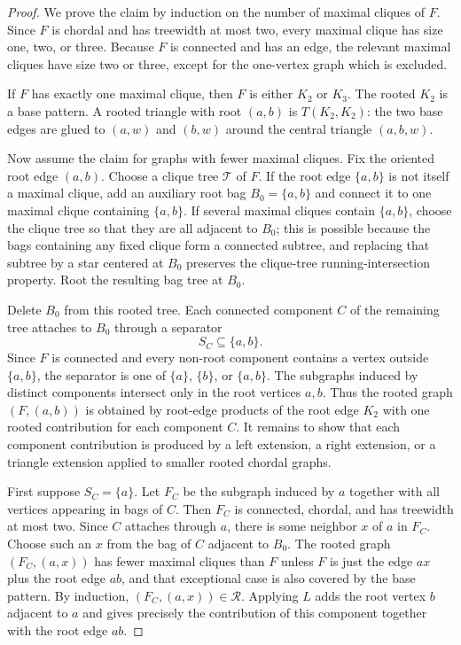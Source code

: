 \documentclass[11pt]{article}
\newcommand{\cR}{\mathcal{R}}
\begin{document}
\begin{proof}
We prove the claim by induction on the number of maximal cliques of $F$.  Since $F$ is chordal and has treewidth at most two, every maximal clique has size one, two, or three.  Because $F$ is connected and has an edge, the relevant maximal cliques have size two or three, except for the one-vertex graph which is excluded.

If $F$ has exactly one maximal clique, then $F$ is either $K_2$ or $K_3$.  The rooted $K_2$ is a base pattern.  A rooted triangle with root $(a,b)$ is $T(K_2,K_2)$: the two base edges are glued to $(a,w)$ and $(b,w)$ around the central triangle $(a,b,w)$.

Now assume the claim for graphs with fewer maximal cliques.  Fix the oriented root edge $(a,b)$.  Choose a clique tree $\mathcal{T}$ of $F$.  If the root edge $\{a,b\}$ is not itself a maximal clique, add an auxiliary root bag $B_0=\{a,b\}$ and connect it to one maximal clique containing $\{a,b\}$.  If several maximal cliques contain $\{a,b\}$, choose the clique tree so that they are all adjacent to $B_0$; this is possible because the bags containing any fixed clique form a connected subtree, and replacing that subtree by a star centered at $B_0$ preserves the clique-tree running-intersection property.  Root the resulting bag tree at $B_0$.

Delete $B_0$ from this rooted tree.  Each connected component $C$ of the remaining tree attaches to $B_0$ through a separator
\[
S_C\subseteq \{a,b\}.
\]
Since $F$ is connected and every non-root component contains a vertex outside $\{a,b\}$, the separator is one of $\{a\}$, $\{b\}$, or $\{a,b\}$.  The subgraphs induced by distinct components intersect only in the root vertices $a,b$.  Thus the rooted graph $(F,(a,b))$ is obtained by root-edge products of the root edge $K_2$ with one rooted contribution for each component $C$.  It remains to show that each component contribution is produced by a left extension, a right extension, or a triangle extension applied to smaller rooted chordal graphs.

First suppose $S_C=\{a\}$.  Let $F_C$ be the subgraph induced by $a$ together with all vertices appearing in bags of $C$.  Then $F_C$ is connected, chordal, and has treewidth at most two.  Since $C$ attaches through $a$, there is some neighbor $x$ of $a$ in $F_C$.  Choose such an $x$ from the bag of $C$ adjacent to $B_0$.  The rooted graph $(F_C,(a,x))$ has fewer maximal cliques than $F$ unless $F$ is just the edge $ax$ plus the root edge $ab$, and that exceptional case is also covered by the base pattern.  By induction, $(F_C,(a,x))\in\cR$.  Applying $L$ adds the root vertex $b$ adjacent to $a$ and gives precisely the contribution of this component together with the root edge $ab$.


\end{proof}
\end{document}
